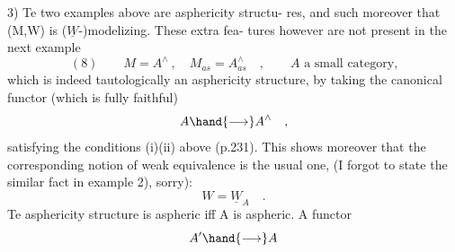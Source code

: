 3)   Te two examples  above  are \hand{\uline{\textcolor{black}{aspheric}}} asphericity structu-%
res,  and such moreover that (M,W) is ($\underline{W}$-)modelizing.  These extra fea-%
tures however are not  present in the next example
\[ (8) \qquad M = A^{\wedge} \ , \quad M_{as} = A^{\wedge}_{as} \quad , \qquad A \text{ a small category,} \]
which is indeed tautologically an asphericity structure,  by taking
the canonical  functor  (which is fully faithful)
\[ A \hand{\longrightarrow} A^{\wedge} \quad , \]
satisfying the conditions (i)(ii) above (p.231).   This shows moreover
that the corresponding notion of weak equivalence is the usual one,
(I forgot to state the similar fact in example 2), sorry):
\[ W = \underline{W}_A \quad . \]
Te asphericity structure is aspheric iff A is aspheric.  A functor
\[ A' \hand{\longrightarrow} A \]
